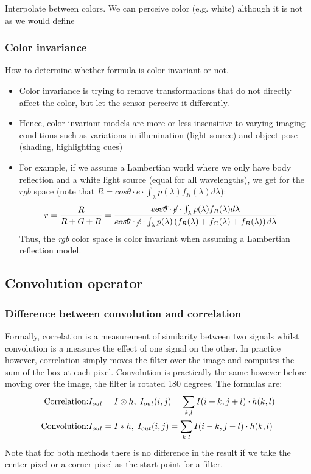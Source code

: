 Interpolate between colors. We can perceive color (e.g. white) although it is not as we would define 
\subsubsection{Color invariance}
How to determine whether formula is color invariant or not. 
\begin{itemize}
	\item Color invariance is trying to remove transformations that do not directly affect the color, but let the sensor perceive it differently. 
	\item Hence, color invariant models are more or less insensitive to varying imaging conditions such as variations in illumination (light source) and object pose (shading, highlighting cues)
	\item For example, if we assume a Lambertian world where we only have body reflection and a white light source (equal for all wavelengths), we get for the $rgb$ space (note that $R=cos\theta \cdot e\cdot \int_{\lambda} p(\lambda) f_R(\lambda)d\lambda$):
	\begin{equation*}
		\begin{split}
			r & = \frac{R}{R + G + B} = \frac{\cancel{cos\theta} \cdot \cancel{e}\cdot \int_{\lambda} p(\lambda) f_R(\lambda)d\lambda}{\cancel{cos\theta} \cdot \cancel{e}\cdot \int_{\lambda} p(\lambda) \left(f_R(\lambda) + f_G(\lambda) + f_B(\lambda)\right)d\lambda}
		\end{split}
	\end{equation*}
	Thus, the \textit{rgb} color space is color invariant when assuming a Lambertian reflection model.
\end{itemize}
\subsection{Convolution operator}
\subsubsection{Difference between convolution and correlation}
Formally, correlation is a measurement of similarity between two signals whilst convolution is a measures the effect of one signal on the other. In practice however, correlation simply moves the filter over the image and computes the sum of the box at each pixel. Convolution is practically the same however before moving over the image, the filter is rotated 180 degrees. The formulas are:
\begin{equation*}
	\begin{split}
		\text{Correlation:} & I_{out} = I \otimes h,\hspace{1mm} I_{out}(i,j) = \sum\limits_{k,l} I(i+k, j+l) \cdot h(k,l)\\
		\text{Convolution:} &  I_{out} = I \ast h,\hspace{1mm} I_{out}(i,j) = \sum\limits_{k,l} I(i-k, j-l) \cdot h(k,l)
	\end{split}
\end{equation*}
Note that for both methods there is no difference in the result if we take the center pixel or a corner pixel as the start point for a filter. 
